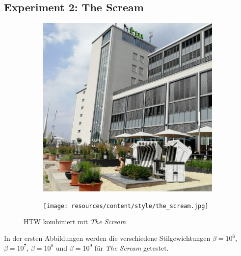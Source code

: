 \pagebreak

\subsection{Experiment 2: The Scream}
\let\thefootnote\relax{}

\begin{figure}[H]
    \centering
    \begin{subfigure}[h]{0.32\textwidth}
        \centering
        \includegraphics[width=\textwidth]{resources/content/content/htw-768x768.jpg}
    \end{subfigure}
    \begin{subfigure}[h]{0.32\textwidth}
        \centering
        \texttt{[image: resources/content/style/the\_scream.jpg]}
    \end{subfigure}
    \caption{HTW kombiniert mit \textit{The Scream} \cite{the_scream_img}}
\end{figure}

In der ersten Abbildungen werden die verschiedene Stilgewichtungen $ \beta = 10^{6} $, $ \beta = 10^{7} $, $ \beta = 10^{8} $ und $ \beta = 10^{9} $ für \textit{The Scream} getestet.

